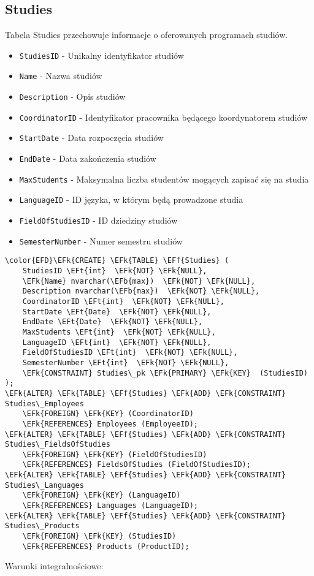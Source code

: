 \documentclass[11pt]{article}
\newcommand{\EFk}[1]{\textcolor{EFk}{\textbf{#1}}} %
\newcommand{\EFb}[1]{\textcolor{EFb}{\textbf{#1}}} %
\newcommand{\EFf}[1]{\textcolor{EFf}{#1}} %
\newcommand{\EFt}[1]{\textcolor{EFt}{\textbf{#1}}} %
\begin{document}
\subsection{Studies}
\label{sec:org2607a95}
Tabela Studies przechowuje informacje o oferowanych programach studiów.
\begin{itemize}
\item \texttt{StudiesID} - Unikalny identyfikator studiów
\item \texttt{Name} - Nazwa studiów
\item \texttt{Description} - Opis studiów
\item \texttt{CoordinatorID} - Identyfikator pracownika będącego koordynatorem studiów
\item \texttt{StartDate} - Data rozpoczęcia studiów
\item \texttt{EndDate} - Data zakończenia studiów
\item \texttt{MaxStudents} - Maksymalna liczba studentów mogących zapisać się na studia
\item \texttt{LanguageID} - ID języka, w którym będą prowadzone studia
\item \texttt{FieldOfStudiesID} - ID dziedziny studiów
\item \texttt{SemesterNumber} - Numer semestru studiów
\end{itemize}
\begin{Code}
\begin{Verbatim}
\color{EFD}\EFk{CREATE} \EFk{TABLE} \EFf{Studies} (
    StudiesID \EFt{int}  \EFk{NOT} \EFk{NULL},
    \EFk{Name} nvarchar(\EFb{max})  \EFk{NOT} \EFk{NULL},
    Description nvarchar(\EFb{max})  \EFk{NOT} \EFk{NULL},
    CoordinatorID \EFt{int}  \EFk{NOT} \EFk{NULL},
    StartDate \EFt{Date}  \EFk{NOT} \EFk{NULL},
    EndDate \EFt{Date}  \EFk{NOT} \EFk{NULL},
    MaxStudents \EFt{int}  \EFk{NOT} \EFk{NULL},
    LanguageID \EFt{int}  \EFk{NOT} \EFk{NULL},
    FieldOfStudiesID \EFt{int}  \EFk{NOT} \EFk{NULL},
    SemesterNumber \EFt{int}  \EFk{NOT} \EFk{NULL},
    \EFk{CONSTRAINT} Studies\_pk \EFk{PRIMARY} \EFk{KEY}  (StudiesID)
);
\EFk{ALTER} \EFk{TABLE} \EFf{Studies} \EFk{ADD} \EFk{CONSTRAINT} Studies\_Employees
    \EFk{FOREIGN} \EFk{KEY} (CoordinatorID)
    \EFk{REFERENCES} Employees (EmployeeID);
\EFk{ALTER} \EFk{TABLE} \EFf{Studies} \EFk{ADD} \EFk{CONSTRAINT} Studies\_FieldsOfStudies
    \EFk{FOREIGN} \EFk{KEY} (FieldOfStudiesID)
    \EFk{REFERENCES} FieldsOfStudies (FieldOfStudiesID);
\EFk{ALTER} \EFk{TABLE} \EFf{Studies} \EFk{ADD} \EFk{CONSTRAINT} Studies\_Languages
    \EFk{FOREIGN} \EFk{KEY} (LanguageID)
    \EFk{REFERENCES} Languages (LanguageID);
\EFk{ALTER} \EFk{TABLE} \EFf{Studies} \EFk{ADD} \EFk{CONSTRAINT} Studies\_Products
    \EFk{FOREIGN} \EFk{KEY} (StudiesID)
    \EFk{REFERENCES} Products (ProductID);
\end{Verbatim}
\end{Code}
Warunki integralnościowe:
\end{document}
